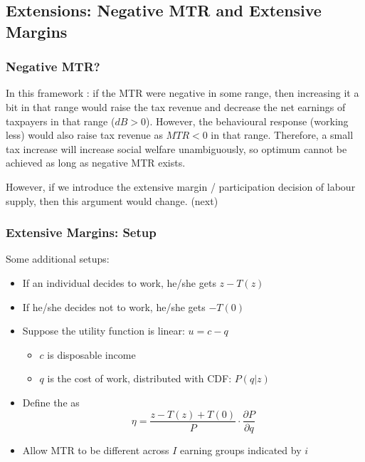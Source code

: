     \subsection{Extensions: Negative MTR and Extensive Margins}

        \subsubsection{Negative MTR?}

            In this framework : if the MTR were negative in some range, then increasing it a bit in that range would raise the tax revenue and decrease the net earnings of taxpayers in that range ($dB>0$). However, the behavioural response (working less) would also raise tax revenue as $MTR<0$ in that range. Therefore, a small tax increase will increase social welfare unambiguously, so optimum cannot be achieved as long as negative MTR exists.

            However, if we introduce the extensive margin / participation decision of labour supply, then this argument would change. (next)

        \subsubsection{Extensive Margins: Setup}

            Some additional setups:
            \begin{itemize}
                \item If an individual decides to work, he/she gets $z-T(z)$
                \item If he/she decides not to work, he/she gets $-T(0)$
                \item Suppose the utility function is linear: $u=c-q$
                \begin{itemize}
                    \item $c$ is disposable income
                    \item $q$ is the cost of work, distributed with CDF: $P(q|z)$
                \end{itemize}
                \item Define the  as $$\eta = \frac{z-T(z)+T(0)}{P} \cdot \frac{\partial P}{\partial q}$$
                \item Allow MTR to be different across $I$ earning groups indicated by $i$
            \end{itemize}

